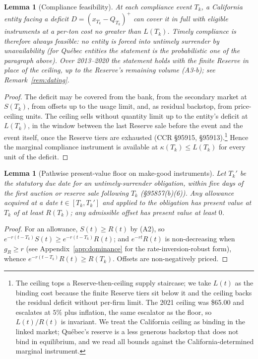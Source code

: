 \documentclass[11pt,letterpaper]{article}
\theoremstyle{plain}
\newtheorem{lemma}[theorem]{Lemma}
\theoremstyle{definition}
\numberwithin{equation}{section}
\begin{document}
\begin{lemma}[Compliance feasibility]\label{lem:feasibility}
At each compliance event $T_k$, a California entity facing a deficit $D=(x_{T_k}-Q_{T_k})^{+}$ can cover it in full with eligible instruments at a per-ton cost no greater than $L(T_k)$. Timely compliance is therefore always feasible: no entity is forced into untimely surrender by unavailability (for Québec entities the statement is the probabilistic one of the paragraph above). Over 2013--2020 the statement holds with the finite Reserve in place of the ceiling, up to the Reserve's remaining volume (A3-b); see Remark~\ref{rem:dating}.
\end{lemma}
\begin{proof}
The deficit may be covered from the bank, from the secondary market at $S(T_k)$, from offsets up to the usage limit, and, as residual backstop, from price-ceiling units. The ceiling sells without quantity limit up to the entity's deficit at $L(T_k)$, in the window between the last Reserve sale before the event and the event itself, once the Reserve tiers are exhausted (CCR \S95915, \S95913).\footnote{The ceiling tops a Reserve-then-ceiling supply staircase; we take $L(t)$ as the binding cost because the finite Reserve tiers sit below it and the ceiling backs the residual deficit without per-firm limit. The 2021 ceiling was \$65.00 and escalates at $5\%$ plus inflation, the same escalator as the floor, so $L(t)/R(t)$ is invariant. We treat the California ceiling as binding in the linked market; Qu\'ebec's reserve is a less generous backstop that does not bind in equilibrium, and we read all bounds against the California-determined marginal instrument.} Hence the marginal compliance instrument is available at $\kappa(T_k)\le L(T_k)$ for every unit of the deficit.
\end{proof}

\begin{lemma}[Pathwise present-value floor on make-good instruments]\label{lem:pvfloor}
Let $T_k'$ be the statutory due date for an untimely-surrender obligation, within five days of the first auction or reserve sale following $T_k$ (\S95857(b)(6)). Any allowance acquired at a date $t\in[T_k,T_k']$ and applied to the obligation has present value at $T_k$ of at least $R(T_k)$; any admissible offset has present value at least $0$.
\end{lemma}
\begin{proof}
For an allowance, $S(t)\ge R(t)$ by (A2), so $e^{-r(t-T_k)}S(t)\ge e^{-r(t-T_k)}R(t)$; and $e^{-rt}R(t)$ is non-decreasing when $g_R\geq r$ (see Appendix~\ref{app:dominance} for the rate-inversion-robust form), whence $e^{-r(t-T_k)}R(t)\ge R(T_k)$. Offsets are non-negatively priced.
\end{proof}
\end{document}
